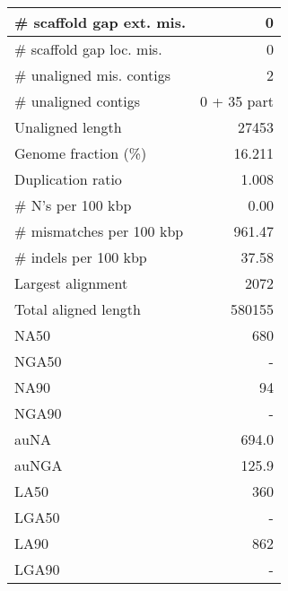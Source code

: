 \documentclass[12pt,a4paper]{article}
\begin{document}
\begin{table}[ht]
\begin{center}
\begin{tabular}{|l*{1}{|r}|}
\# scaffold gap ext. mis. & 0 \\ \hline
\# scaffold gap loc. mis. & 0 \\ \hline
\# unaligned mis. contigs & 2 \\ \hline
\# unaligned contigs & 0 + 35 part \\ \hline
Unaligned length & 27453 \\ \hline
Genome fraction (\%) & 16.211 \\ \hline
Duplication ratio & 1.008 \\ \hline
\# N's per 100 kbp & 0.00 \\ \hline
\# mismatches per 100 kbp & 961.47 \\ \hline
\# indels per 100 kbp & 37.58 \\ \hline
Largest alignment & 2072 \\ \hline
Total aligned length & 580155 \\ \hline
NA50 & 680 \\ \hline
NGA50 & - \\ \hline
NA90 & 94 \\ \hline
NGA90 & - \\ \hline
auNA & 694.0 \\ \hline
auNGA & 125.9 \\ \hline
LA50 & 360 \\ \hline
LGA50 & - \\ \hline
LA90 & 862 \\ \hline
LGA90 & - \\ \hline
\end{tabular}
\end{center}
\end{table}
\end{document}
